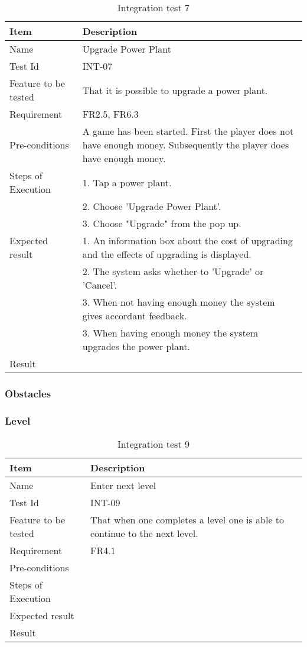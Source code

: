 \begin{table}[H]
\centering
	\begin{tabular}{ l | p{8cm} }
		\hline
		{\bf Item} & {\bf Description} \\ \hline
		Name & Upgrade Power Plant\\ 
		Test Id & INT-07 \\ 
		Feature to be tested & That it is possible to upgrade a power plant. \\ 
		Requirement & FR2.5, FR6.3 \\ 
		Pre-conditions & A game has been started. First the player does not have enough money. Subsequently the player does have enough money. \\ 
		Steps of Execution & 1. Tap a power plant. \\ 
		& 2. Choose 'Upgrade Power Plant'. \\
		& 3. Choose "Upgrade" from the pop up. \\
		Expected result & 1. An information box about the cost of upgrading and the effects of upgrading is displayed. \\
		& 2. The system asks whether to 'Upgrade' or 'Cancel'. \\
		& 3. When not having enough money the system gives accordant feedback. \\
		& 3. When having enough money the system upgrades the power plant. \\
		Result & \\ 
	\end{tabular}
	\caption{Integration test 7}
\end{table}

\subsubsection{Obstacles}

\subsubsection{Level}

\begin{table}[H]
\centering
	\begin{tabular}{ l | p{8cm} }
		\hline
		{\bf Item} & {\bf Description} \\ \hline
		Name & Enter next level \\ 
		Test Id & INT-09 \\ 
		Feature to be tested & That when one completes a level one is able to continue to the next level. \\ 
		Requirement & FR4.1 \\ 
		Pre-conditions & \\ 
		Steps of Execution & \\ 
		Expected result & \\ 
		Result & \\ 
	\end{tabular}
	\caption{Integration test 9}
\end{table}

